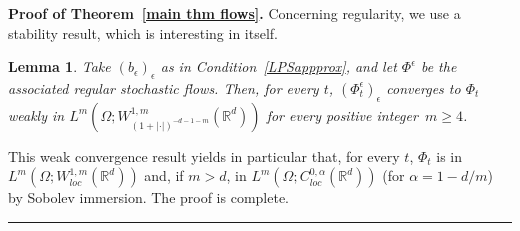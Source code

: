 \documentclass[a4paper,10pt]{article}
\newtheorem{lemma}[theorem]{Lemma}
\newenvironment{proof}[1][Proof]{\noindent\textbf{#1.} }{\ \rule{0.5em}{0.5em}}
\newcommand{\mr}{\mathbb{R}}
\newcommand{\eps}{\epsilon}
\begin{document}
\begin{proof}[Proof of Theorem~\ref{main thm flows}]
Concerning regularity, we use a stability result, which is interesting in itself.

\begin{lemma}\label{stability}
Take $(b_\eps)_\eps$ as in Condition~\ref{LPSappprox}, and let $\Phi^\eps$ be the associated regular stochastic flows. Then, for every $t$, $(\Phi^\eps_t)_\eps$ converges to $\Phi_t$ weakly in $L^m(\Omega;W^{1,m}_{(1+|\cdot|)^{-d-1-m}}(\mr^d))$ for every positive integer~$m \geq 4$.
\end{lemma}

This weak convergence result yields in particular that, for every $t$, $\Phi_t$ is in $L^m(\Omega;W^{1,m}_{loc}(\mr^d))$ and, if $m>d$, in $L^m(\Omega;C^{0,\alpha}_{loc}(\mr^d))$ (for $\alpha=1-d/m$) by Sobolev immersion. The proof is complete.
\end{proof}
\end{document}
